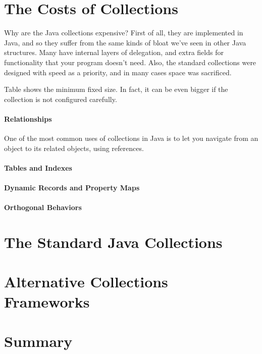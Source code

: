 \section{The Costs of Collections}

Why are the Java collections expensive? First of all,
they are implemented in Java, and so they suffer from the
same kinds of bloat we've seen in other Java structures. Many have internal layers of delegation, and extra fields
for functionality that your program doesn't need. Also, the standard collections
were designed with speed as a priority, and in many cases space was
sacrificed.




Table shows the minimum fixed size.  In fact, it can be even bigger if the
collection is not configured carefully.
\paragraph{Relationships}  One of the most common uses of collections in Java is
to let you navigate from an object to its related objects, using references.
\paragraph{Tables and Indexes}
\paragraph{Dynamic Records and Property Maps}
\paragraph{Orthogonal Behaviors}

\section{The Standard Java Collections}

\section{Alternative Collections Frameworks}

\section{Summary}

